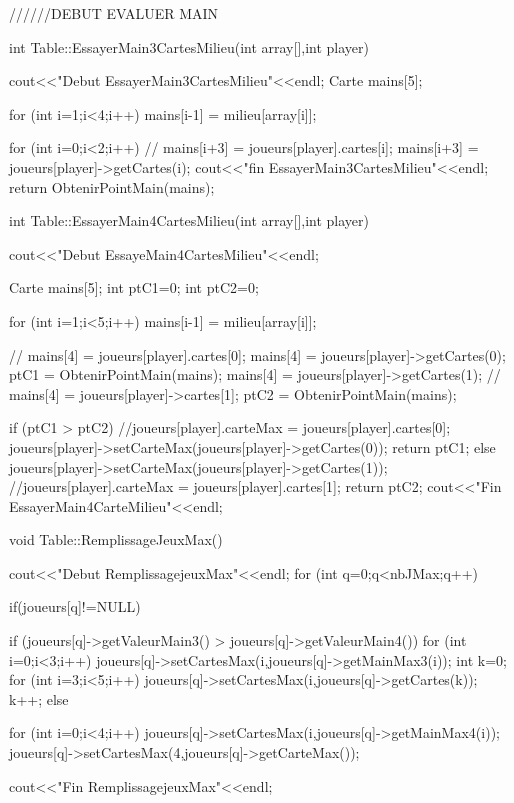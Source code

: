 \documentclass{article}
\begin{document}
//////DEBUT EVALUER MAIN


int Table::EssayerMain3CartesMilieu(int array[],int player)
{
  cout<<"Debut EssayerMain3CartesMilieu"<<endl;
	Carte mains[5];

         for (int i=1;i<4;i++)
                mains[i-1] = milieu[array[i]];

         for (int i=0;i<2;i++)
	  {
             //   mains[i+3] = joueurs[player].cartes[i];
		mains[i+3] = joueurs[player]->getCartes(i);
	  }
	 cout<<"fin EssayerMain3CartesMilieu"<<endl;
         return ObtenirPointMain(mains);
}

int Table::EssayerMain4CartesMilieu(int array[],int player)
{
  cout<<"Debut EssayeMain4CartesMilieu"<<endl;

	Carte mains[5];
	int ptC1=0;
	int ptC2=0;

         for (int i=1;i<5;i++)
	{
                mains[i-1] = milieu[array[i]];
	}

	// mains[4] = joueurs[player].cartes[0];
	 mains[4] = joueurs[player]->getCartes(0);
	 ptC1 = ObtenirPointMain(mains);
	 mains[4] = joueurs[player]->getCartes(1);
     //    mains[4] = joueurs[player]->cartes[1];
	 ptC2 = ObtenirPointMain(mains);

	 if (ptC1 > ptC2)
	{	
		//joueurs[player].carteMax = joueurs[player].cartes[0];
	  joueurs[player]->setCarteMax(joueurs[player]->getCartes(0));
	  return ptC1;
	}
	 else
	   {
	     joueurs[player]->setCarteMax(joueurs[player]->getCartes(1));
	     //joueurs[player].carteMax = joueurs[player].cartes[1];
	     return ptC2;
	   }
	 cout<<"Fin EssayerMain4CarteMilieu"<<endl;
}



void Table::RemplissageJeuxMax()
{
  cout<<"Debut RemplissagejeuxMax"<<endl;
  for (int q=0;q<nbJMax;q++)
    {
      if(joueurs[q]!=NULL){
	if (joueurs[q]->getValeurMain3() > joueurs[q]->getValeurMain4())
	  {
	    for (int i=0;i<3;i++)
	      {
		joueurs[q]->setCartesMax(i,joueurs[q]->getMainMax3(i));
	      }
	    int k=0;
	    for (int i=3;i<5;i++)
	      {
		joueurs[q]->setCartesMax(i,joueurs[q]->getCartes(k));
		k++;
	      }
	  }
	else
	  {
	    for (int i=0;i<4;i++)
	      {
		joueurs[q]->setCartesMax(i,joueurs[q]->getMainMax4(i));
	      }
	    joueurs[q]->setCartesMax(4,joueurs[q]->getCarteMax());
	    
	    
	  }
      }
    }
  cout<<"Fin RemplissagejeuxMax"<<endl;
}
\end{document}
